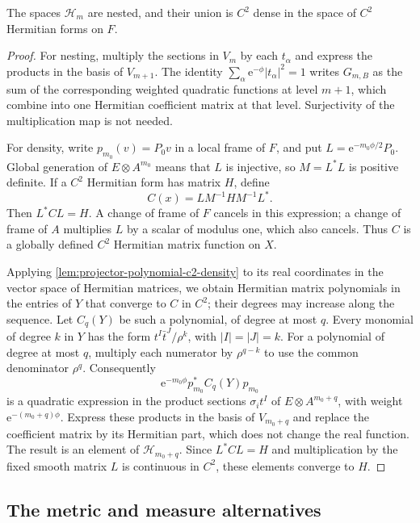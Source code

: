 \begin{lemma}\label{lem:first-jet-nested-metric-density}
The spaces $\mathcal H_m$ are nested, and their union is $C^2$ dense in the space of $C^2$ Hermitian forms on $F$.
\end{lemma}
\begin{proof}
For nesting, multiply the sections in $V_m$ by each $t_\alpha$ and express the products in the basis of $V_{m+1}$. The identity $\sum_\alpha\mathrm e^{-\phi}|t_\alpha|^2=1$ writes $G_{m,B}$ as the sum of the corresponding weighted quadratic functions at level $m+1$, which combine into one Hermitian coefficient matrix at that level. Surjectivity of the multiplication map is not needed.

For density, write $p_{m_0}(v)=P_0v$ in a local frame of $F$, and put $L=\mathrm e^{-m_0\phi/2}P_0$. Global generation of $E\otimes A^{m_0}$ means that $L$ is injective, so $M=L^*L$ is positive definite. If a $C^2$ Hermitian form has matrix $H$, define
\[
 C(x)=L M^{-1}H M^{-1}L^*.
\]
Then $L^*CL=H$. A change of frame of $F$ cancels in this expression; a change of frame of $A$ multiplies $L$ by a scalar of modulus one, which also cancels. Thus $C$ is a globally defined $C^2$ Hermitian matrix function on $X$.

Applying \cref{lem:projector-polynomial-c2-density} to its real coordinates in the vector space of Hermitian matrices, we obtain Hermitian matrix polynomials in the entries of $Y$ that converge to $C$ in $C^2$; their degrees may increase along the sequence. Let $C_q(Y)$ be such a polynomial, of degree at most $q$. Every monomial of degree $k$ in $Y$ has the form $t^I\bar t^J/\rho^k$, with $|I|=|J|=k$. For a polynomial of degree at most $q$, multiply each numerator by $\rho^{q-k}$ to use the common denominator $\rho^q$. Consequently
\[
 \mathrm e^{-m_0\phi}p_{m_0}^*C_q(Y)p_{m_0}
\]
is a quadratic expression in the product sections $\sigma_i t^I$ of $E\otimes A^{m_0+q}$, with weight $\mathrm e^{-(m_0+q)\phi}$. Express these products in the basis of $V_{m_0+q}$ and replace the coefficient matrix by its Hermitian part, which does not change the real function. The result is an element of $\mathcal H_{m_0+q}$. Since $L^*CL=H$ and multiplication by the fixed smooth matrix $L$ is continuous in $C^2$, these elements converge to $H$.
\end{proof}

\subsection{The metric and measure alternatives}

